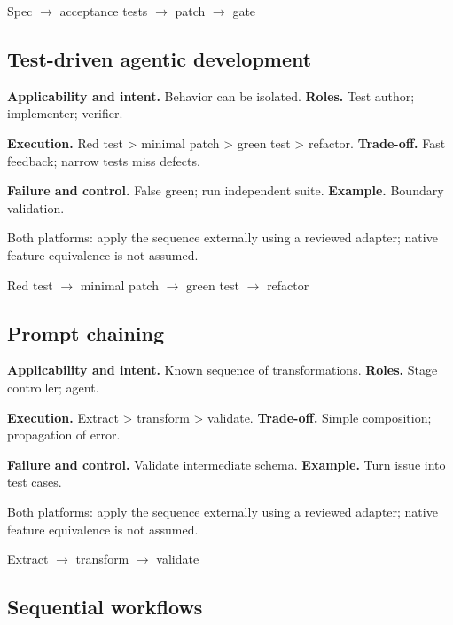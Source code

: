\begin{center}\small \textsf{Spec} $\rightarrow$ \textsf{acceptance tests} $\rightarrow$ \textsf{patch} $\rightarrow$ \textsf{gate}\end{center}

\subsection{Test-driven agentic development}

\textbf{Applicability and intent.} Behavior can be isolated. \textbf{Roles.} Test author; implementer; verifier.

\textbf{Execution.} Red test > minimal patch > green test > refactor. \textbf{Trade-off.} Fast feedback; narrow tests miss defects.

\textbf{Failure and control.} False green; run independent suite. \textbf{Example.} Boundary validation.

Both platforms: apply the sequence externally using a reviewed adapter; native feature equivalence is not assumed.

\begin{center}\small \textsf{Red test} $\rightarrow$ \textsf{minimal patch} $\rightarrow$ \textsf{green test} $\rightarrow$ \textsf{refactor}\end{center}

\subsection{Prompt chaining}

\textbf{Applicability and intent.} Known sequence of transformations. \textbf{Roles.} Stage controller; agent.

\textbf{Execution.} Extract > transform > validate. \textbf{Trade-off.} Simple composition; propagation of error.

\textbf{Failure and control.} Validate intermediate schema. \textbf{Example.} Turn issue into test cases.

Both platforms: apply the sequence externally using a reviewed adapter; native feature equivalence is not assumed.

\begin{center}\small \textsf{Extract} $\rightarrow$ \textsf{transform} $\rightarrow$ \textsf{validate}\end{center}

\subsection{Sequential workflows}

